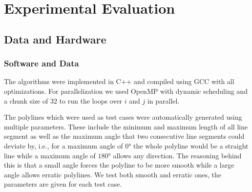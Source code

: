 \newcommand{\N}{\mathbb{N}}
\newcommand{\Z}{\mathbb{Z}}
\newcommand{\R}{\mathbb{R}}

\newcommand{\parenth}[1]{\left(#1\right)}
\newcommand{\angl}[1]{\left\langle#1\right\rangle}
\newcommand{\floor}[1]{\left\lfloor#1\right\rfloor}
\newcommand{\ceil}[1]{\left\lceil#1\right\rceil}


\renewcommand*{\O}{\mathcal{O}}













\section{Experimental Evaluation}
\label{sec:evaluation}

\subsection{Data and Hardware}
\label{subsec:hardware}

\subsubsection{Software and Data}
\label{subsubsec:software}
The algorithms were implemented in C++ and compiled using GCC with all optimizations. For parallelization we used OpenMP with dynamic scheduling and a chunk size of \(32\) to run the loops over \(i\) and \(j\) in parallel. 

The polylines which were used as test cases were automatically generated using multiple parameters. These include the minimum and maximum length of all line segment as well as the maximum angle that two consecutive line segments could deviate by, i.e., for a maximum angle of \(0\)° the whole polyline would be a straight line while a maximum angle of \(180\)° allows any direction. The reasoning behind this is that a small angle forces the polyline to be more smooth while a large angle allows erratic polylines. We test both smooth and erratic ones, the parameters are given for each test case. 

